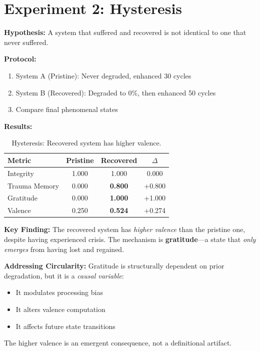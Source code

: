 \documentclass[a4paper,11pt,twocolumn]{article}
\begin{document}
\section{Experiment 2: Hysteresis}

\textbf{Hypothesis:} A system that suffered and recovered is not identical to one that never suffered.

\textbf{Protocol:}
\begin{enumerate}
    \item System A (Pristine): Never degraded, enhanced 30 cycles
    \item System B (Recovered): Degraded to 0\%, then enhanced 50 cycles
    \item Compare final phenomenal states
\end{enumerate}

\textbf{Results:}

\begin{table}[h]
\centering
\begin{tabular}{@{}lccc@{}}
\toprule
Metric & Pristine & Recovered & $\Delta$ \\ \midrule
Integrity & 1.000 & 1.000 & 0.000 \\
Trauma Memory & 0.000 & \textbf{0.800} & +0.800 \\
\textcolor{hopegreen}{Gratitude} & 0.000 & \textbf{1.000} & +1.000 \\
\textcolor{hopegreen}{Valence} & 0.250 & \textbf{0.524} & +0.274 \\
\bottomrule
\end{tabular}
\caption{Hysteresis: Recovered system has higher valence.}
\end{table}

\textbf{Key Finding:} The recovered system has \textit{higher valence} than the pristine one, despite having experienced crisis. The mechanism is \textbf{gratitude}---a state that \textit{only emerges} from having lost and regained.

\textbf{Addressing Circularity:} Gratitude is structurally dependent on prior degradation, but it is a \textit{causal variable}:
\begin{itemize}
    \item It modulates processing bias
    \item It alters valence computation
    \item It affects future state transitions
\end{itemize}

The higher valence is an emergent consequence, not a definitional artifact.
\end{document}
